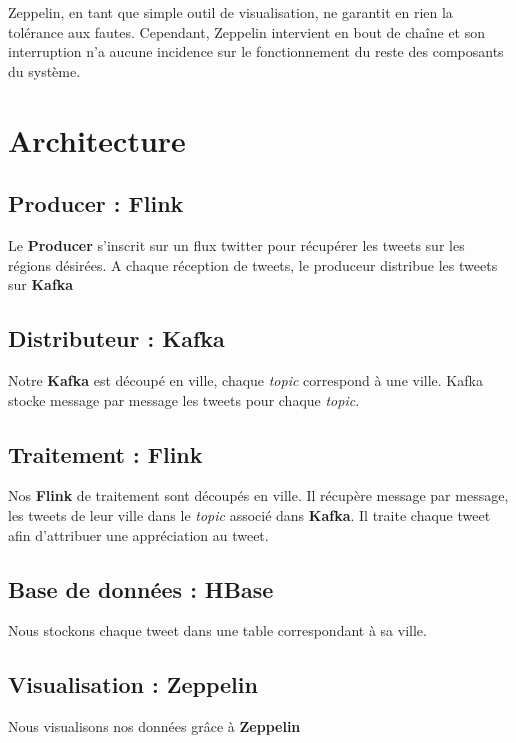 \documentclass[a4paper,oneside,10pt]{article}
\begin{document}
Zeppelin, en tant que simple outil de visualisation, ne garantit en rien la tolérance aux fautes. Cependant, Zeppelin intervient en bout de chaîne et son interruption n'a aucune incidence sur le fonctionnement du reste des composants du système. 


\section{Architecture}

\subsection{Producer : Flink}

Le \textbf{Producer} s'inscrit sur un flux twitter pour récupérer les tweets sur les régions désirées. A chaque réception de tweets, le produceur distribue les tweets sur \textbf{Kafka}

\subsection{Distributeur : Kafka}

Notre \textbf{Kafka} est découpé en ville, chaque \textit{topic} correspond à une ville. Kafka stocke message par message les tweets pour chaque \textit{topic}. 

\subsection{Traitement : Flink}

Nos \textbf{Flink} de traitement sont découpés en ville. Il récupère message par message, les tweets de leur ville dans le \textit{topic} associé dans \textbf{Kafka}. Il traite chaque tweet afin d'attribuer une appréciation au tweet. 

\subsection{Base de données : HBase}

Nous stockons chaque tweet dans une table correspondant à sa ville. 


\subsection{Visualisation : Zeppelin}

Nous visualisons nos données grâce à \textbf{Zeppelin}
\end{document}
